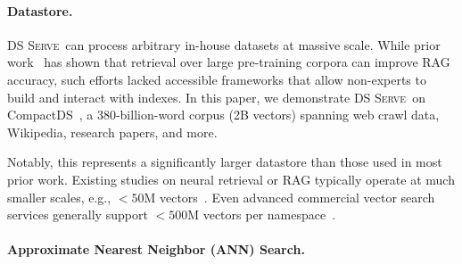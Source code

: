 \documentclass[letterpaper]{article} %
\newcommand{\sys}{\textsc{DS Serve\xspace}}%
\begin{document}
\paragraph{Datastore.}

\sys\ can process arbitrary in-house datasets at massive scale. While prior work~\cite{massiveds,compactds} has shown that retrieval over large pre-training corpora can improve RAG accuracy, such efforts lacked accessible frameworks that allow non-experts to build and interact with indexes. In this paper, we demonstrate \sys\ on CompactDS~\cite{compactds}, a 380-billion-word corpus (2B vectors) spanning web crawl data, Wikipedia, research papers, and more.

Notably, this represents a significantly larger datastore than those used in most prior work. Existing studies on neural retrieval or RAG typically operate at much smaller scales, e.g., $<50$M vectors~\cite{jin2024long,jin2025search,hu2025hedrarag}. Even advanced commercial vector search services generally support $<500$M vectors per namespace~\cite{Turbopuffer2025}. 

\vspace{-.3em}
\paragraph{Approximate Nearest Neighbor (ANN) Search.}
\end{document}
